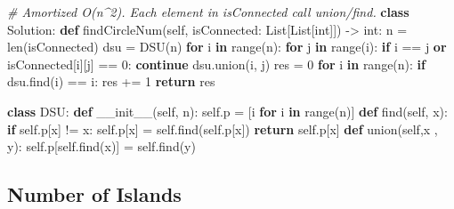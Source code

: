 \documentclass[
]{article}
\newenvironment{Shaded}{}{}
\newcommand{\BuiltInTok}[1]{#1}
\newcommand{\CommentTok}[1]{\textcolor[rgb]{0.38,0.63,0.69}{\textit{#1}}}
\newcommand{\ControlFlowTok}[1]{\textcolor[rgb]{0.00,0.44,0.13}{\textbf{#1}}}
\newcommand{\DecValTok}[1]{\textcolor[rgb]{0.25,0.63,0.44}{#1}}
\newcommand{\FunctionTok}[1]{\textcolor[rgb]{0.02,0.16,0.49}{#1}}
\newcommand{\KeywordTok}[1]{\textcolor[rgb]{0.00,0.44,0.13}{\textbf{#1}}}
\newcommand{\NormalTok}[1]{#1}
\newcommand{\OperatorTok}[1]{\textcolor[rgb]{0.40,0.40,0.40}{#1}}
\newcommand{\VariableTok}[1]{\textcolor[rgb]{0.10,0.09,0.49}{#1}}
\begin{document}
\begin{Shaded}
\begin{Highlighting}[]
\CommentTok{\# Amortized O(n\^{}2). Each element in isConnected call union/find.}
\KeywordTok{class}\NormalTok{ Solution:}
    \KeywordTok{def}\NormalTok{ findCircleNum(}\VariableTok{self}\NormalTok{, isConnected: List[List[}\BuiltInTok{int}\NormalTok{]]) }\OperatorTok{{-}\textgreater{}} \BuiltInTok{int}\NormalTok{:}
\NormalTok{        n }\OperatorTok{=} \BuiltInTok{len}\NormalTok{(isConnected)}
\NormalTok{        dsu }\OperatorTok{=}\NormalTok{ DSU(n)}
        \ControlFlowTok{for}\NormalTok{ i }\KeywordTok{in} \BuiltInTok{range}\NormalTok{(n):}
            \ControlFlowTok{for}\NormalTok{ j }\KeywordTok{in} \BuiltInTok{range}\NormalTok{(i):}
                \ControlFlowTok{if}\NormalTok{ i }\OperatorTok{==}\NormalTok{ j }\KeywordTok{or}\NormalTok{ isConnected[i][j] }\OperatorTok{==} \DecValTok{0}\NormalTok{: }\ControlFlowTok{continue}
\NormalTok{                dsu.union(i, j)}
\NormalTok{        res }\OperatorTok{=} \DecValTok{0}
        \ControlFlowTok{for}\NormalTok{ i }\KeywordTok{in} \BuiltInTok{range}\NormalTok{(n): }
            \ControlFlowTok{if}\NormalTok{ dsu.find(i) }\OperatorTok{==}\NormalTok{ i: }
\NormalTok{                res }\OperatorTok{+=} \DecValTok{1}
        \ControlFlowTok{return}\NormalTok{ res}

\KeywordTok{class}\NormalTok{ DSU: }
    \KeywordTok{def} \FunctionTok{\_\_init\_\_}\NormalTok{(}\VariableTok{self}\NormalTok{, n):}
        \VariableTok{self}\NormalTok{.p }\OperatorTok{=}\NormalTok{ [i }\ControlFlowTok{for}\NormalTok{ i }\KeywordTok{in} \BuiltInTok{range}\NormalTok{(n)]}
    \KeywordTok{def}\NormalTok{ find(}\VariableTok{self}\NormalTok{, x):}
        \ControlFlowTok{if} \VariableTok{self}\NormalTok{.p[x] }\OperatorTok{!=}\NormalTok{ x:}
            \VariableTok{self}\NormalTok{.p[x] }\OperatorTok{=} \VariableTok{self}\NormalTok{.find(}\VariableTok{self}\NormalTok{.p[x])}
        \ControlFlowTok{return} \VariableTok{self}\NormalTok{.p[x]}
    \KeywordTok{def}\NormalTok{ union(}\VariableTok{self}\NormalTok{,x , y):}
        \VariableTok{self}\NormalTok{.p[}\VariableTok{self}\NormalTok{.find(x)] }\OperatorTok{=} \VariableTok{self}\NormalTok{.find(y)}

\end{Highlighting}
\end{Shaded}

\hypertarget{number-of-islands}{%
\subsection{Number of Islands}\label{number-of-islands}}
\end{document}
